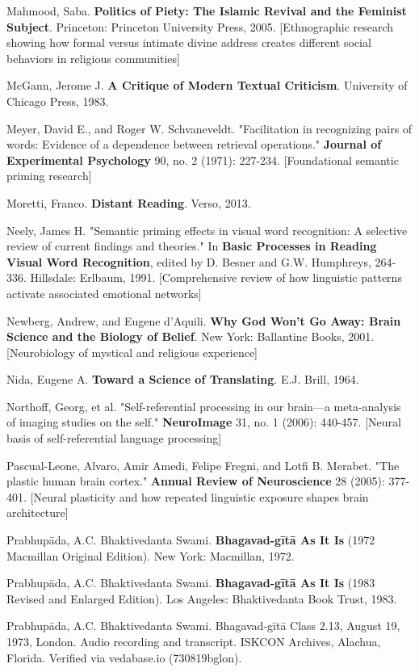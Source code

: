\documentclass[12pt,twoside]{book}
\begin{document}
Mahmood, Saba. \textbf{Politics of Piety: The Islamic Revival and the Feminist Subject}. Princeton: Princeton University Press, 2005. [Ethnographic research showing how formal versus intimate divine address creates different social behaviors in religious communities]

McGann, Jerome J. \textbf{A Critique of Modern Textual Criticism}. University of Chicago Press, 1983.

Meyer, David E., and Roger W. Schvaneveldt. "Facilitation in recognizing pairs of words: Evidence of a dependence between retrieval operations." \textbf{Journal of Experimental Psychology} 90, no. 2 (1971): 227-234. [Foundational semantic priming research]

Moretti, Franco. \textbf{Distant Reading}. Verso, 2013.

Neely, James H. "Semantic priming effects in visual word recognition: A selective review of current findings and theories." In \textbf{Basic Processes in Reading Visual Word Recognition}, edited by D. Besner and G.W. Humphreys, 264-336. Hillsdale: Erlbaum, 1991. [Comprehensive review of how linguistic patterns activate associated emotional networks]

Newberg, Andrew, and Eugene d'Aquili. \textbf{Why God Won't Go Away: Brain Science and the Biology of Belief}. New York: Ballantine Books, 2001. [Neurobiology of mystical and religious experience]

Nida, Eugene A. \textbf{Toward a Science of Translating}. E.J. Brill, 1964.

Northoff, Georg, et al. "Self-referential processing in our brain—a meta-analysis of imaging studies on the self." \textbf{NeuroImage} 31, no. 1 (2006): 440-457. [Neural basis of self-referential language processing]

Pascual-Leone, Alvaro, Amir Amedi, Felipe Fregni, and Lotfi B. Merabet. "The plastic human brain cortex." \textbf{Annual Review of Neuroscience} 28 (2005): 377-401. [Neural plasticity and how repeated linguistic exposure shapes brain architecture]

Prabhupāda, A.C. Bhaktivedanta Swami. \textbf{Bhagavad-gītā As It Is} (1972 Macmillan Original Edition). New York: Macmillan, 1972.

Prabhupāda, A.C. Bhaktivedanta Swami. \textbf{Bhagavad-gītā As It Is} (1983 Revised and Enlarged Edition). Los Angeles: Bhaktivedanta Book Trust, 1983.

Prabhupāda, A.C. Bhaktivedanta Swami. Bhagavad-gītā Class 2.13, August 19, 1973, London. Audio recording and transcript. ISKCON Archives, Alachua, Florida. Verified via vedabase.io (730819bglon).
\end{document}
